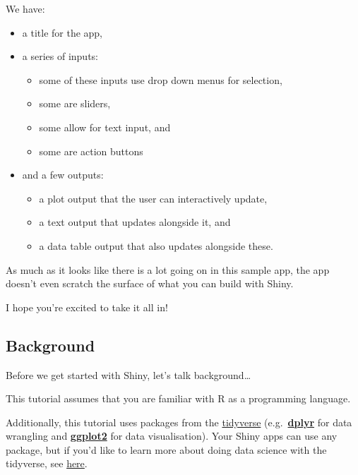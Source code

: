 \documentclass[
  letterpaper,
  DIV=11,
  numbers=noendperiod]{scrreprt}
\providecommand{\tightlist}{%
  \setlength{\itemsep}{0pt}\setlength{\parskip}{0pt}}
\begin{document}
We have:

\begin{itemize}
\tightlist
\item
  a title for the app,
\item
  a series of inputs:

  \begin{itemize}
  \tightlist
  \item
    some of these inputs use drop down menus for selection,
  \item
    some are sliders,
  \item
    some allow for text input, and
  \item
    some are action buttons
  \end{itemize}
\item
  and a few outputs:

  \begin{itemize}
  \tightlist
  \item
    a plot output that the user can interactively update,
  \item
    a text output that updates alongside it, and
  \item
    a data table output that also updates alongside these.
  \end{itemize}
\end{itemize}

As much as it looks like there is a lot going on in this sample app, the
app doesn't even scratch the surface of what you can build with Shiny.

I hope you're excited to take it all in!

\hypertarget{background}{%
\subsection{Background}\label{background}}

Before we get started with Shiny, let's talk background\ldots{}

This tutorial assumes that you are familiar with R as a programming
language.

Additionally, this tutorial uses packages from the
\href{https://tidyverse.org/}{tidyverse}
(e.g.~\href{https://dplyr.tidyverse.org/}{\textbf{dplyr}} for data
wrangling and \href{https://ggplot2.tidyverse.org/}{\textbf{ggplot2}}
for data visualisation). Your Shiny apps can use any package, but if
you'd like to learn more about doing data science with the tidyverse,
see \href{https://www.tidyverse.org/learn/}{here}.
\end{document}
